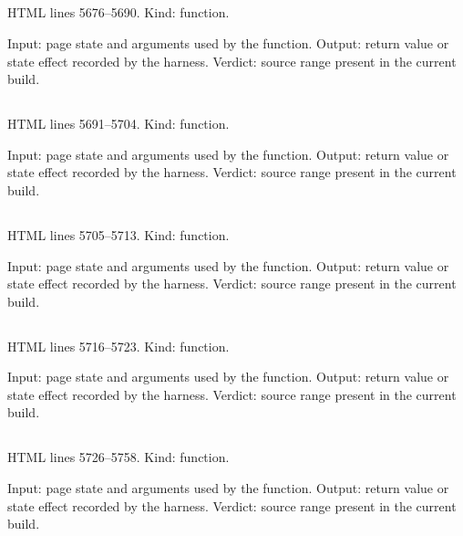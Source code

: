 \subsection*{\texttt{}}
\label{vf_257_ccLzss}
HTML lines 5676--5690. Kind: function.

Input: page state and arguments used by the function.
Output: return value or state effect recorded by the harness.
Verdict: source range present in the current build.

\subsection*{\texttt{}}
\label{vf_258_ccDecodeArz}
HTML lines 5691--5704. Kind: function.

Input: page state and arguments used by the function.
Output: return value or state effect recorded by the harness.
Verdict: source range present in the current build.

\subsection*{\texttt{}}
\label{vf_259_ccIxoTemperatureLog}
HTML lines 5705--5713. Kind: function.

Input: page state and arguments used by the function.
Output: return value or state effect recorded by the harness.
Verdict: source range present in the current build.

\subsection*{\texttt{}}
\label{vf_260_ccIxoAcquisitions}
HTML lines 5716--5723. Kind: function.

Input: page state and arguments used by the function.
Output: return value or state effect recorded by the harness.
Verdict: source range present in the current build.

\subsection*{\texttt{}}
\label{vf_261_ccThermalSteps}
HTML lines 5726--5758. Kind: function.

Input: page state and arguments used by the function.
Output: return value or state effect recorded by the harness.
Verdict: source range present in the current build.

